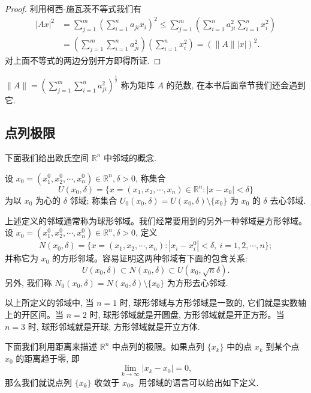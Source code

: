 \begin{proof}
利用柯西-施瓦茨不等式我们有
\[
\begin{aligned}
  |Ax|^2
  &=\sum_{j=1}^m\left(\sum_{i=1}^n a_{ji}x_i\right)^2
    \leqslant \sum_{j=1}^m\left(\sum_{i=1}^n a_{ji}^2\sum_{i=1}^n x_i^2\right)\\
  &=\left(\sum_{j=1}^m\sum_{i=1}^n a_{ji}^2\right)
    \left(\sum_{i=1}^n x_i^2\right)
    =(\|A\||x|)^2.
\end{aligned}
\]
对上面不等式的两边分别开方即得所证.
\end{proof}


\begin{remark}\label{remark:ma-13-source-4}
$\|A\|=\left(\sum\limits_{j=1}^m\sum\limits_{i=1}^n a_{ji}^2\right)^{\frac12}$ 称为矩阵 $A$ 的范数, 在本书后面章节我们还会遇到它.
\end{remark}


\subsection{点列极限}
\label{subsec:ma-13-1-2}

下面我们给出欧氏空间 $\mathbb R^n$ 中邻域的概念.

\begin{definition}\label{definition:ma-13-1-2}
设 $x_0=(x_1^0,x_2^0,\cdots,x_n^0)\in\mathbb R^n,\delta>0$, 称集合
\[
  U(x_0,\delta)=\{x=(x_1,x_2,\cdots,x_n)\in\mathbb R^n:|x-x_0|<\delta\}
\]
为以 $x_0$ 为心的 $\delta$ 邻域; 称集合 $U_0(x_0,\delta)=U(x_0,\delta)\setminus\{x_0\}$ 为 $x_0$ 的 $\delta$ 去心邻域.
\end{definition}

上述定义的邻域通常称为球形邻域。我们经常要用到的另外一种邻域是方形邻域。设 $x_0=(x_1^0,x_2^0,\cdots,x_n^0)\in\mathbb R^n,\delta>0$, 定义
\[
  N(x_0,\delta)=\{x=(x_1,x_2,\cdots,x_n): |x_i-x_i^0|<\delta,\ i=1,2,\cdots,n\};
\]
并称它为 $x_0$ 的方形邻域。容易证明这两种邻域有下面的包含关系:
\[
  U(x_0,\delta)\subset N(x_0,\delta)\subset U(x_0,\sqrt n\delta).
\]
另外, 我们称 $N_0(x_0,\delta)=N(x_0,\delta)\setminus\{x_0\}$ 为方形去心邻域.

以上所定义的邻域中, 当 $n=1$ 时, 球形邻域与方形邻域是一致的, 它们就是实数轴上的开区间。当 $n=2$ 时, 球形邻域就是开圆盘, 方形邻域就是开正方形。当 $n=3$ 时, 球形邻域就是开球, 方形邻域就是开立方体.

下面我们利用距离来描述 $\mathbb R^n$ 中点列的极限。如果点列 $\{x_k\}$ 中的点 $x_k$ 到某个点 $x_0$ 的距离趋于零, 即
\[
  \lim_{k\to\infty}|x_k-x_0|=0,
\]
那么我们就说点列 $\{x_k\}$ 收敛于 $x_0$。用邻域的语言可以给出如下定义.


